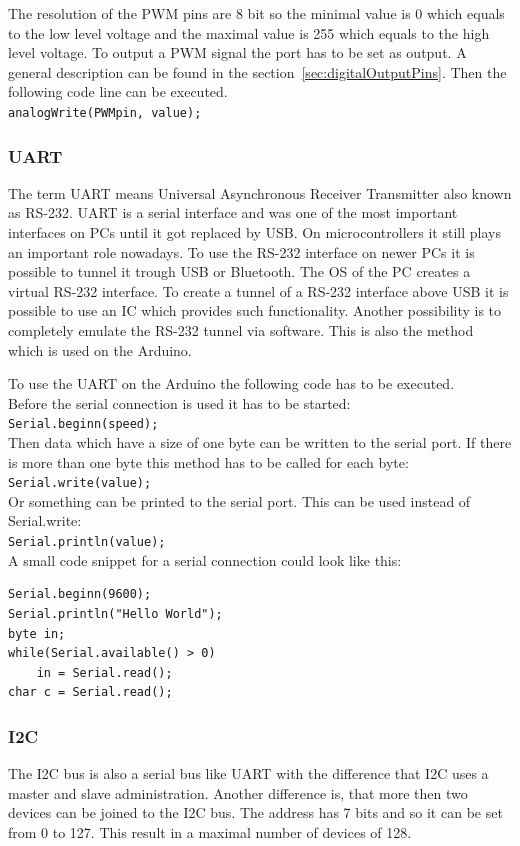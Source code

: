 The resolution of the PWM pins are 8 bit so the minimal value is 0 which equals to the low level voltage and the maximal value is 255 which equals to the high level voltage. 
To output a PWM signal the port has to be set as output. A general description can be found in the section~\ref{sec:digitalOutputPins}. %
Then the following code line can be executed.\\
\lstinline|analogWrite(PWMpin, value);|


\subsubsection{UART}\label{sec:uart}
The term UART means Universal Asynchronous Receiver Transmitter also known as RS-232.
UART is a serial interface and was one of the most important interfaces on PCs until it got replaced by USB. On microcontrollers it still plays an important role nowadays.
To use the RS-232 interface on newer PCs it is possible to tunnel it trough USB or Bluetooth. 
The OS of the PC creates a virtual RS-232 interface.
To create a tunnel of a RS-232 interface above USB it is possible to use an IC which provides such functionality.
Another possibility is to completely emulate the RS-232 tunnel via software.
This is also the method which is used on the Arduino.

To use the UART on the Arduino the following code has to be executed.\\
Before the serial connection is used it has to be started: \\
\lstinline|Serial.beginn(speed);| \\
Then data which have a size of one byte can be written to the serial port.
If there is more than one byte this method has to be called for each byte: \\
\lstinline|Serial.write(value);| \\
Or something can be printed to the serial port. 
This can be used instead of Serial.write:\\
\lstinline|Serial.println(value);| \\

A small code snippet for a serial connection could look like this:\\
\begin{lstlisting}
Serial.beginn(9600);
Serial.println("Hello World");
byte in;
while(Serial.available() > 0)
	in = Serial.read();
char c = Serial.read();
\end{lstlisting}


\subsubsection{I2C}\label{sec:i2c}
The I2C bus is also a serial bus like UART with the difference that I2C uses a master and slave administration.
Another difference is, that more then two devices can be joined to the I2C bus.
The address has 7 bits and so it can be set from 0 to 127.
This result in a maximal number of devices of 128.

